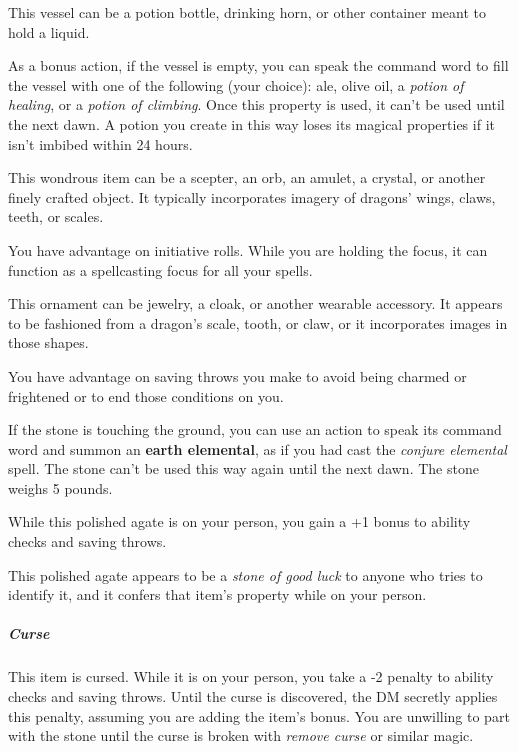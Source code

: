 \documentclass[10pt,a4paper,twoside,bg=print,twocolumn,openany,nodeprecatedcode]{dndbook}
\begin{document}
This vessel can be a potion bottle, drinking horn, or other container meant to hold a liquid.

As a bonus action, if the vessel is empty, you can speak the command word to fill the vessel with one of the following (your choice): ale, olive oil, a \textit{potion of healing}, or a \textit{potion of climbing}. Once this property is used, it can't be used until the next dawn. A potion you create in this way loses its magical properties if it isn't imbibed within 24 hours.

This wondrous item can be a scepter, an orb, an amulet, a crystal, or another finely crafted object. It typically incorporates imagery of dragons' wings, claws, teeth, or scales.

You have advantage on initiative rolls. While you are holding the focus, it can function as a spellcasting focus for all your spells.

This ornament can be jewelry, a cloak, or another wearable accessory. It appears to be fashioned from a dragon's scale, tooth, or claw, or it incorporates images in those shapes.

You have advantage on saving throws you make to avoid being charmed or frightened or to end those conditions on you.

If the stone is touching the ground, you can use an action to speak its command word and summon an \textbf{earth elemental}, as if you had cast the \textit{conjure elemental} spell. The stone can't be used this way again until the next dawn. The stone weighs 5 pounds.

While this polished agate is on your person, you gain a +1 bonus to ability checks and saving throws.

This polished agate appears to be a \textit{stone of good luck} to anyone who tries to identify it, and it confers that item's property while on your person.

\subparagraph{Curse}
This item is cursed. While it is on your person, you take a -2 penalty to ability checks and saving throws. Until the curse is discovered, the DM secretly applies this penalty, assuming you are adding the item's bonus. You are unwilling to part with the stone until the curse is broken with \textit{remove curse} or similar magic.
\end{document}

